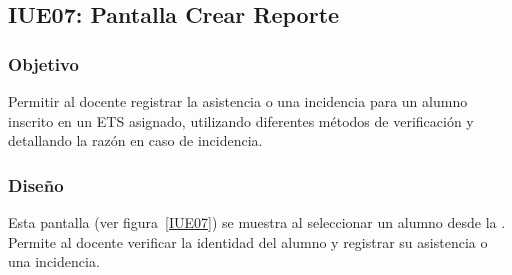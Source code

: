 
\subsection{IUE07: Pantalla Crear Reporte}

\newpage

\subsubsection{Objetivo}
Permitir al docente registrar la asistencia o una incidencia para un alumno inscrito en un ETS asignado, utilizando diferentes métodos de verificación y detallando la razón en caso de incidencia.

\subsubsection{Diseño}
Esta pantalla  (ver figura~\ref{IUE07}) se muestra al seleccionar un alumno desde la . Permite al docente verificar la identidad del alumno y registrar su asistencia o una incidencia.



